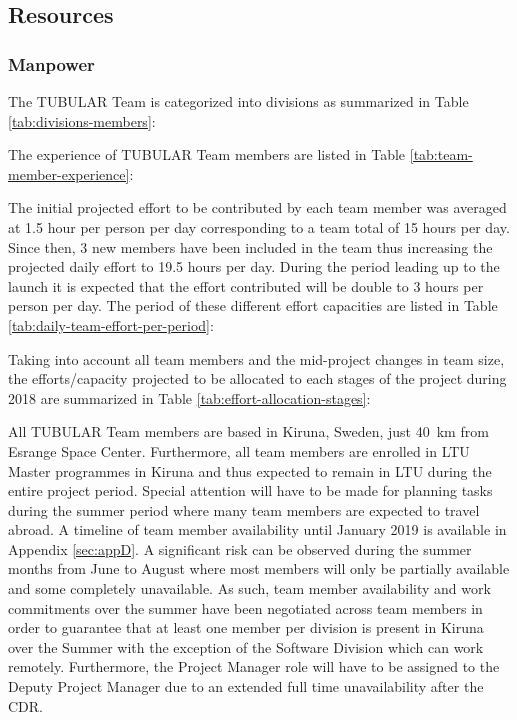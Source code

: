 \subsection{Resources}

\subsubsection{Manpower}
The TUBULAR Team is categorized into divisions as summarized in Table \ref{tab:divisions-members}:



The experience of TUBULAR Team members are listed in Table \ref{tab:team-member-experience}:



The initial projected effort to be contributed by each team member was averaged at 1.5 hour per person per day corresponding to a team total of 15 hours per day. Since then, 3 new members have been included in the team thus increasing the projected daily effort to 19.5 hours per day. During the period leading up to the launch it is expected that the effort contributed will be double to 3 hours per person per day. The period of these different effort capacities are listed in Table \ref{tab:daily-team-effort-per-period}:



Taking into account all team members and the mid-project changes in team size, the efforts/capacity projected to be allocated to each stages of the project during 2018 are summarized in Table \ref{tab:effort-allocation-stages}:



All TUBULAR Team members are based in Kiruna, Sweden, just \SI{40}{\kilo\meter} from Esrange Space Center. Furthermore, all team members are enrolled in LTU Master programmes in Kiruna and thus expected to remain in LTU during the entire project period. Special attention will have to be made for planning tasks during the summer period where many team members are expected to travel abroad. A timeline of team member availability  until January 2019 is available in Appendix \ref{sec:appD}. A significant risk can be observed during the summer months from June to August where most members will only be partially available and some completely unavailable. As such, team member availability and work commitments over the summer have been negotiated across team members in order to guarantee that at least one member per division is present in Kiruna over the Summer with the exception of the Software Division which can work remotely. Furthermore, the Project Manager role will have to be assigned to the Deputy Project Manager due to an extended full time unavailability after the CDR.

